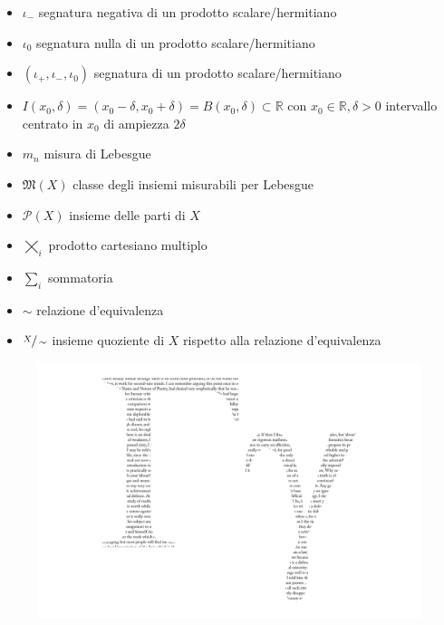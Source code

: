 \documentclass[12pt, twoside, italian]{book}
\begin{document}
\begin{itemize}[label=\hspace{-0.5em}]
		\item $\iota_-$ segnatura negativa di un prodotto scalare/hermitiano
		\item $\iota_0$ segnatura nulla di un prodotto scalare/hermitiano
		\item $(\iota_+, \iota_-, \iota_0)$ segnatura di un prodotto scalare/hermitiano
		\item $I(x_0, \delta) = (x_0 - \delta, x_0 + \delta) = B(x_0, \delta) \subset \mathbb{R}$ con $x_0 \in \mathbb{R}, \delta > 0$ intervallo centrato in $x_0$ di ampiezza $2\delta$
		\item $m_n$ misura di Lebesgue
		\item $\mathfrak{M}(X)$ classe degli insiemi misurabili per Lebesgue
		\item $\mathcal{P}(X)$ insieme delle parti di $X$
		\item $\varprod\limits_i$ prodotto cartesiano multiplo
		\item $\sum\limits_i$ sommatoria
		\item $\sim$ relazione d'equivalenza
		\item $\sfrac{X}{\sim}$ insieme quoziente di $X$ rispetto alla relazione d'equivalenza
 
	\end{itemize}
	
	
	
	
	
	
	
	\newpage
	\clearpage
	\cleardoublepage
	\pagestyle{plain}
	\thispagestyle{empty}
	\vspace*{\fill}
	\begin{figure}[H]
		\centering
		\hspace*{-1cm}
		\includegraphics[scale=0.25]{immagini/gamma_illustrata.png}
	\end{figure}
\end{document}
